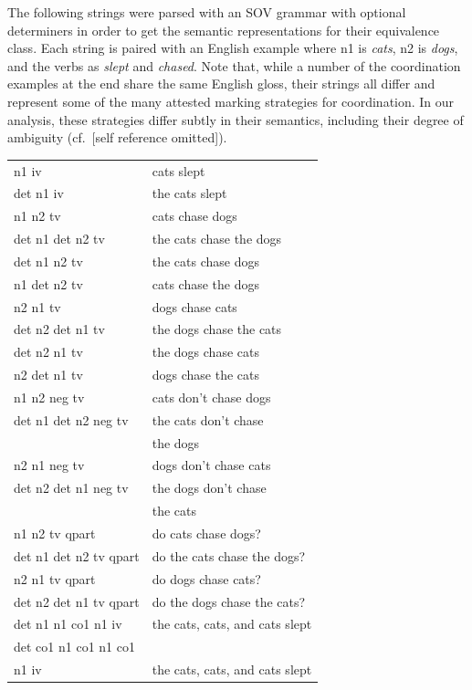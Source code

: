 \documentclass[11pt]{article}
\begin{document}
The following strings were parsed with an SOV grammar with
optional determiners in order to get the semantic representations
for their equivalence class.  Each string is paired with an English
example where n1 is {\it cats}, n2 is {\it dogs}, and the verbs
as {\it slept} and {\it chased}.  Note that, while a number of the
coordination examples at the end share the same English gloss, their
strings all differ and represent some of the many attested marking
strategies for coordination.  In our analysis, these strategies differ
subtly in their semantics, including their degree of ambiguity (cf.~[self
reference omitted]).

\hspace{-15pt}
\begin{tabular}{ll}
n1 iv & cats slept\\
det n1 iv & the cats slept \\
n1 n2 tv & cats chase dogs\\
det n1 det n2 tv & the cats chase the dogs\\
det n1 n2 tv & the cats chase dogs\\
n1 det n2 tv & cats chase the dogs\\
n2 n1 tv & dogs chase cats\\
det n2 det n1 tv & the dogs chase the cats\\
det n2 n1 tv & the dogs chase cats\\
n2 det n1 tv & dogs chase the cats\\
n1 n2 neg tv & cats don't chase dogs\\
det n1 det n2 neg tv & the cats don't chase \\
 & \phantom{...}the dogs\\
n2 n1 neg tv & dogs don't chase cats\\
det n2 det n1 neg tv & the dogs don't chase \\
 & \phantom{...}the cats\\
n1 n2 tv qpart & do cats chase dogs?\\
det n1 det n2 tv qpart & do the cats chase the dogs?\\
n2 n1 tv qpart & do dogs chase cats?\\
det n2 det n1 tv qpart & do the dogs chase the cats?\\
det n1 n1 co1 n1 iv & the cats, cats, and cats slept\\
det co1 n1 co1 n1 co1 & \\
\phantom{...}n1 iv & the cats, cats, and cats slept\\

\end{tabular}
\end{document}
